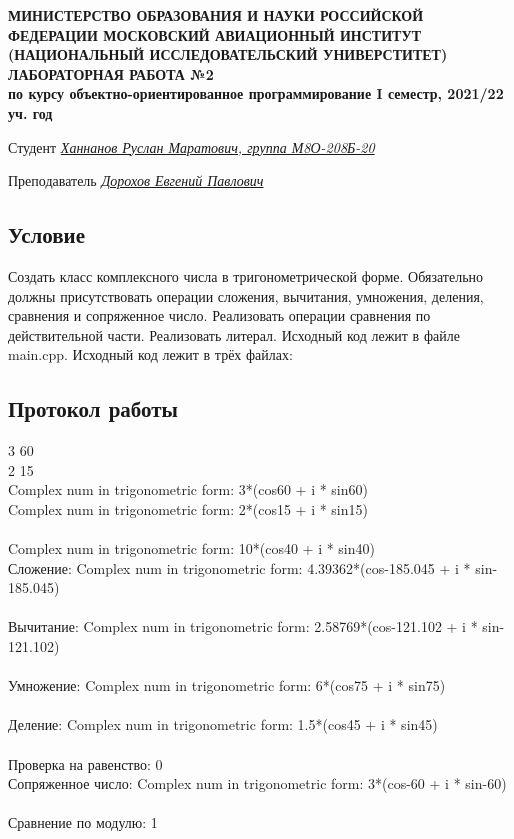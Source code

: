 \documentclass[12pt]{article}
\begin{document}
\begin{titlepage}
\begin{center}
\textbf{МИНИСТЕРСТВО ОБРАЗОВАНИЯ И НАУКИ РОССИЙСКОЙ ФЕДЕРАЦИИ
\medskip
МОСКОВСКИЙ АВИАЦИОННЫЙ ИНСТИТУТ
(НАЦИОНАЛЬНЫЙ ИССЛЕДОВАТЕЛЬСКИЙ УНИВЕРСТИТЕТ)
\vfill\vfill
{\Huge ЛАБОРАТОРНАЯ РАБОТА №2} \\
по курсу объектно-ориентированное программирование
I семестр, 2021/22 уч. год}
\end{center}
\vfill

Студент \uline{\it {Ханнанов Руслан Маратович, группа М8О-208Б-20}\hfill}

Преподаватель \uline{\it {Дорохов Евгений Павлович}\hfill}

\vfill
\end{titlepage}

\subsection*{Условие}
Создать класс комплексного числа в тригонометрической форме. Обязательно должны присутствовать операции сложения, вычитания, умножения, деления, сравнения и сопряженное число. Реализовать операции сравнения по действительной части. Реализовать литерал. Исходный код лежит в файле main.cpp.
Исходный код лежит в трёх файлах:
\pagebreak
\subsection*{Протокол работы}
3 60 \\
2 15 \\
Complex num in trigonometric form: 3*(cos60 + i * sin60) \\
Complex num in trigonometric form: 2*(cos15 + i * sin15) \\
\\
Complex num in trigonometric form: 10*(cos40 + i * sin40)
\\
Сложение: Complex num in trigonometric form: 4.39362*(cos-185.045 + i * sin-185.045) \\
\\
Вычитание: Complex num in trigonometric form: 2.58769*(cos-121.102 + i * sin-121.102) \\
\\
Умножение: Complex num in trigonometric form: 6*(cos75 + i * sin75) \\
\\
Деление: Complex num in trigonometric form: 1.5*(cos45 + i * sin45) \\
\\
Проверка на равенство: 0 \\
Сопряженное число: Complex num in trigonometric form: 3*(cos-60 + i * sin-60) \\
\\
Сравнение по модулю: 1 \\
\end{document}
